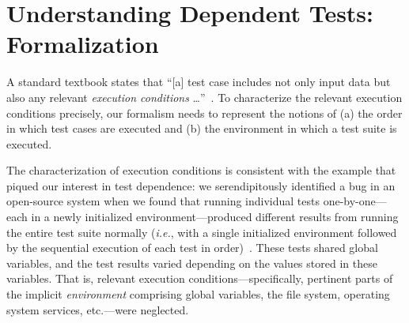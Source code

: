 
\section{Understanding Dependent Tests: Formalization}
\label{sec:formalism}

A standard textbook 
states that ``[a] test case includes not only input data but
also any relevant \emph{execution conditions}
\dots''~\cite[p.~152, emphasis added]{pezze-young:2007}.   
To characterize the relevant execution conditions precisely, 
our formalism needs to represent the notions of
(a) the order in which test cases are executed and (b) the environment in which a test suite is executed.  

The characterization of execution conditions is
consistent with the example that 
 piqued our interest in test dependence: we seren\-dip\-itously identified a bug in an open-source
system when we found that running individual tests one-by-one---each
in a newly initialized environment---produced different
results from running the entire test suite normally (\emph{i.e.}, with a single initialized environment followed by
the sequential execution of each test in order)~\cite{DBLP:conf/sigsoft/MusluSW11}.  These tests
shared global variables, and the test results varied depending on the
values stored in these variables.  That is, relevant execution conditions---specifically, pertinent parts
of the implicit \emph{environment} comprising global variables, the file system, operating system services, etc.---were neglected.


